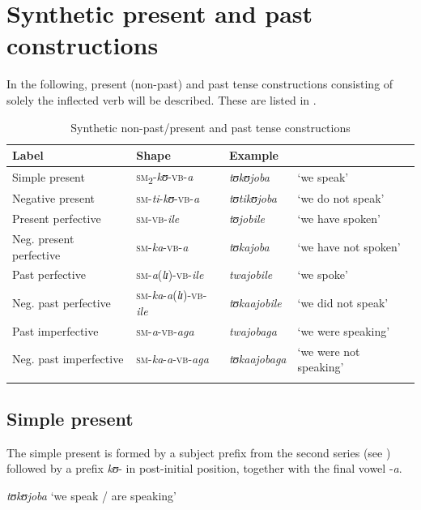 \section{Synthetic present and past constructions} \label{SimpleConstructions}
In the following, present (non-past) and past tense constructions consisting of solely the inflected verb will be described. These are listed in .
\begin{table}[hh]
\setlength{\tabcolsep}{2pt}
\begin{tabularx}{\textwidth}{llll}
\lsptoprule
\footnotesize{Label} & \footnotesize{Shape} & \footnotesize{Example}\\
\midrule 
Simple present & \textsc{sm}\textsubscript{2}-\textit{kʊ}-\textsc{vb}-\textit{a} & \textit{tʊkʊjoba} & \lq we  speak' \\  
Negative present & \textsc{sm}-\textit{ti}-\textit{kʊ}-\textsc{vb}-\textit{a} &  \textit{tʊtikʊjoba} & \lq we do not speak'\\ 
Present perfective & \textsc{sm}-\textsc{vb}-\textit{ile} & \textit{tʊjobile} & \lq we have spoken'\\ 
Neg. present perfective & \textsc{sm}-\textit{ka}-\textsc{vb}-\textit{a} & \textit{tʊkajoba} & \lq we have not spoken'\\ 
Past perfective & \textsc{sm}-\textit{a}(\textit{lɪ})-\textsc{vb}-\textit{ile} & \textit{twajobile} & \lq we spoke' \\ 
Neg. past perfective & \textsc{sm}-\textit{ka}-\textit{a}(\textit{lɪ})-\textsc{vb}-\textit{ile} & \textit{tʊkaajobile} & \lq we did not speak' \\ 
Past imperfective & \textsc{sm}-\textit{a}-\textsc{vb}-\textit{aga} & \textit{twajobaga} & \lq we were speaking' \\ 
Neg. past imperfective & \textsc{sm}-\textit{ka}-\textit{a}-\textsc{vb}-\textit{aga} & \textit{tʊkaajobaga} & \lq we were not speaking' \\  
\lspbottomrule  
\end{tabularx}
\caption{Synthetic non-past/present and past tense constructions}\label{tableSimpleConstructions}
\end{table}
\subsection{Simple present}\label{Present}
The simple present is formed by a subject prefix from the second series (see ) followed by a prefix \textit{kʊ}- in post-initial position, together with the final vowel -\textit{a}.
\begin{exe}
\ex\textit{tʊkʊjoba} \lq we speak / are speaking'
\end{exe}

